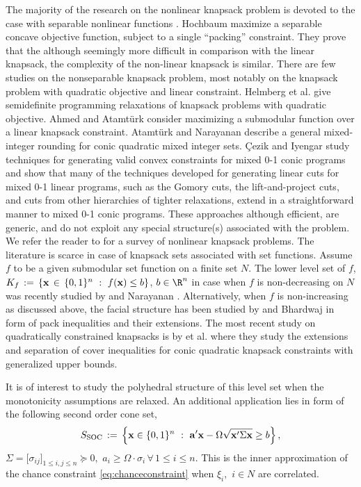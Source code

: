 \documentclass[10pt,twoside]{amsart}
\begin{document}
The majority of the research on the nonlinear knapsack problem is devoted to the case with separable nonlinear functions \cite{Morin1976}. Hochbaum \cite{Hochbaum1995} maximize a separable concave objective function, subject to a single ``packing'' constraint. They prove that the although seemingly more difficult in comparison with the linear knapsack, the complexity of the non-linear knapsack is similar. There are few studies on the nonseparable knapsack problem, most notably on the knapsack problem with quadratic objective and linear constraint. Helmberg et al. \cite{Helmberg2000} give semidefinite programming relaxations of knapsack problems with quadratic objective. Ahmed and Atamt\"{u}rk \cite{Ahmed2011} consider maximizing a submodular function over a linear knapsack constraint. Atamt\"{u}rk and Narayanan \cite{Atamturk2010} describe a general mixed-integer rounding for conic quadratic mixed integer sets. \c{C}ezik and Iyengar \cite{Cezik2005} study techniques for generating valid convex constraints for mixed 0-1 conic programs and show that many of the techniques developed for generating linear cuts for mixed 0-1 linear programs, such as the Gomory cuts, the lift-and-project cuts, and cuts from other hierarchies of tighter relaxations, extend in a straightforward manner to mixed 0-1 conic programs. These approaches although efficient, are generic, and do not exploit any special structure(s) associated with the problem. We refer the reader to \cite{Bretthauer2002,Kellerer2004} for a survey of nonlinear knapsack problems. The literature is scarce in case of knapsack sets associated with set functions. Assume $f$ to be a given submodular set function on a finite set $N$. The lower level set of $f$, $K_f \,:=\, \left\{ {\mathbf{x}\,\in\, \{0,1\}^n} \ : \ {f(\mathbf{x}) \leq b} \right\}$, $b \in \R^n$ in case when $f$ is non-decreasing on $N$ was recently studied by \atam and Narayanan \cite{Atamturk2009333}. Alternatively, when $f$ is non-increasing as discussed above, the facial structure has been studied by \atam and Bhardwaj in form of pack inequalities and their extensions. The most recent study on quadratically constrained knapsacks is by \atam et al. \cite{Atamturk2013} where they study the extensions and separation of cover inequalities for conic quadratic knapsack constraints with generalized upper bounds.

It is of interest to study the polyhedral structure of this level set when the monotonicity assumptions are relaxed. An additional application lies in form of the following second order cone set, $$S_{\text{SOC}} \,:=\, \left\{ {\mathbf{x} \in \{0,1\}^n} \ : \ {\mathbf{a}'\mathbf{x} - \Omega\sqrt{\mathbf{x}'\Sigma\mathbf{x}}\geq b} \right\},$$ $\Sigma = \lbrack\sigma_{ij}\rbrack_{1\leq i, j \leq n}\succeq 0,\,\, a_i \geq \Omega\cdot\sigma_i\,\forall\, 1\leq i \leq n$. This is the inner approximation of the chance constraint \eqref{eq:chanceconstraint} when $\xi_i,\,\,i\in N$ are correlated.\\
\end{document}
